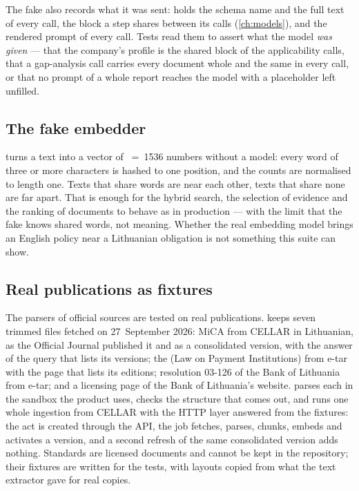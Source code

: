 The fake also records what it was sent:  holds the schema name and the full
text of every call,  the block a step shares between its calls
(\cref{ch:models}), and  the rendered prompt of every call. Tests
read them to assert what the model \emph{was given} --- that the
company's profile is the shared block of the applicability calls, that a gap-analysis call
carries every document whole and the same in every call, or that no prompt of a whole report
reaches the model with a placeholder left unfilled.

\subsection{The fake embedder}\label{sec:testing:api:embed}

 turns a text into a vector of ~=~1536 numbers without a
model: every word of three or more characters is hashed to one position, and the counts are
normalised to length one. Texts that share words are near each other, texts that share none
are far apart. That is enough for the hybrid search, the selection of evidence and the ranking
of documents to behave as in production --- with the limit that the fake knows shared
words, not meaning. Whether the real embedding model brings an English policy near a
Lithuanian obligation is not something this suite can show.

\subsection{Real publications as fixtures}\label{sec:testing:api:fixtures}

The parsers of official sources are tested on real publications. 
keeps seven trimmed files fetched on 27~September 2026: MiCA from CELLAR in Lithuanian, as the
Official Journal published it and as a consolidated version, with the answer of the query that
lists its versions; the  (Law on Payment Institutions) from
e-tar with the page that lists its editions; resolution 03-126 of the Bank of Lithuania from
e-tar; and a licensing page of the Bank of Lithuania's website. 
parses each in the sandbox the product uses, checks the structure that comes out, and runs one
whole ingestion from CELLAR with the HTTP layer answered from the fixtures: the act is created
through the API, the job fetches, parses, chunks, embeds and activates a version, and a second
refresh of the same consolidated version adds nothing. Standards are licensed documents and
cannot be kept in the repository; their fixtures are written for the tests, with layouts
copied from what the text extractor gave for real copies.

